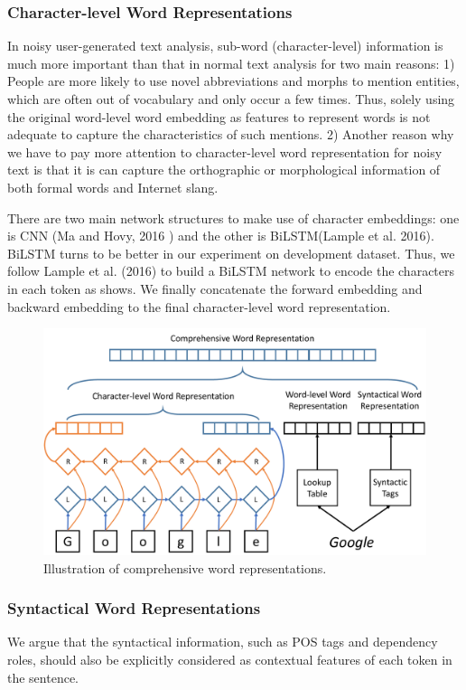 \subsubsection{Character-level Word Representations}
In noisy user-generated text analysis, sub-word (character-level) information is much more important than that in normal text analysis for two main reasons:
1) People are more likely to use novel abbreviations and morphs to mention entities, which are often out of vocabulary and only occur a few times. 
Thus, solely using the original word-level word embedding as features to represent  words is not adequate to capture the characteristics of such mentions.
2) Another reason why we have to pay more attention to character-level word representation for noisy text is that it is can capture the orthographic or morphological information of both formal words and Internet slang. 

There are two main network structures to make use of character embeddings: 
one is CNN (Ma and Hovy, 2016 \cite{} ) and the other is BiLSTM(Lample et al. 2016).
BiLSTM turns to be better in our experiment on development dataset.
Thus, we follow Lample et al. (2016) to build a BiLSTM network to encode the characters in each token as  shows.
We finally concatenate the forward embedding and backward embedding to the final character-level word representation.
\begin{figure}[th!]
	\includegraphics[width=\columnwidth]{figures/comprehensive}
	\caption{Illustration of comprehensive word representations.}
	\label{fig:comprehensive}
\end{figure}
\subsubsection{Syntactical Word Representations}
We argue that the syntactical information, such as POS tags and dependency roles, should also be explicitly considered as contextual features of each token in the sentence. 

